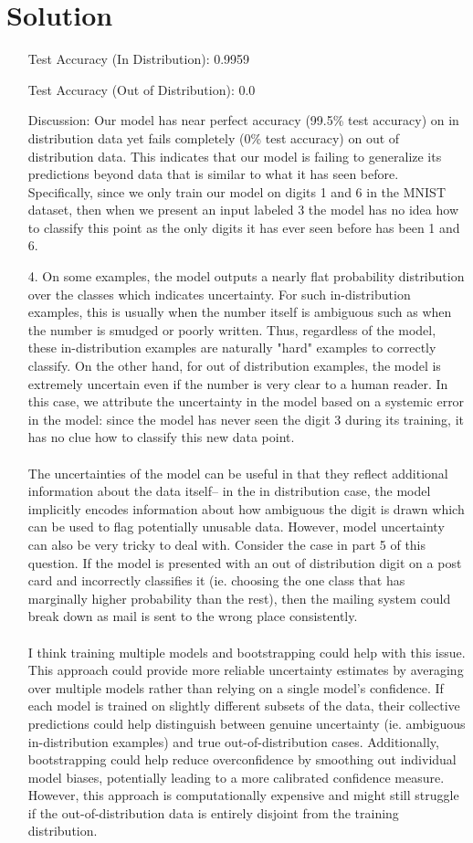 \documentclass[submit]{../harvardml}
\newenvironment{answer}
  {\section*{Solution}}
{}
\begin{document}
\begin{answer}
\begin{enumerate}
      Test Accuracy (In Distribution): 0.9959

      Test Accuracy (Out of Distribution): 0.0

      Discussion: Our model has near perfect accuracy (99.5\% test accuracy) on in distribution data yet fails completely (0\% test accuracy) on out of distribution data. This indicates that our model is failing to generalize its predictions beyond data that is similar to what it has seen before. Specifically, since we only train our model on digits 1 and 6 in the MNIST dataset, then when we present an input labeled 3 the model has no idea how to classify this point as the only digits it has ever seen before has been 1 and 6. 

    \item[4.] On some examples, the model outputs a nearly flat probability distribution over the classes which indicates uncertainty. For such in-distribution examples, this is usually when the number itself is ambiguous such as when the number is smudged or poorly written. Thus, regardless of the model, these in-distribution examples are naturally "hard" examples to correctly classify. On the other hand, for out of distribution examples, the model is extremely uncertain even if the number is very clear to a human reader. In this case, we attribute the uncertainty in the model based on a systemic error in the model: since the model has never seen the digit $3$ during its training, it has no clue how to classify this new data point.
    \\
    \\
    The uncertainties of the model can be useful in that they reflect additional information about the data itself-- in the in distribution case, the model implicitly encodes information about how ambiguous the digit is drawn which can be used to flag potentially unusable data. However, model uncertainty can also be very tricky to deal with. Consider the case in part 5 of this question. If the model is presented with an out of distribution digit on a post card and incorrectly classifies it (ie. choosing the one class that has marginally higher probability than the rest), then the mailing system could break down as mail is sent to the wrong place consistently.
    \\
    \\
    I think training multiple models and bootstrapping could help with this issue. This approach could provide more reliable uncertainty estimates by averaging over multiple models rather than relying on a single model’s confidence. If each model is trained on slightly different subsets of the data, their collective predictions could help distinguish between genuine uncertainty (ie. ambiguous in-distribution examples) and true out-of-distribution cases. Additionally, bootstrapping could help reduce overconfidence by smoothing out individual model biases, potentially leading to a more calibrated confidence measure. However, this approach is computationally expensive and might still struggle if the out-of-distribution data is entirely disjoint from the training distribution.


\end{enumerate}
\end{answer}
\end{document}
